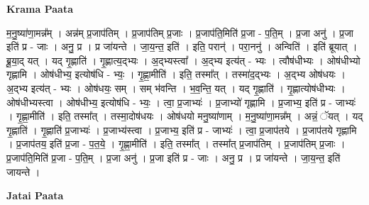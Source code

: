 \documentclass[17pt]{extarticle}
\begin{document}
\textbf{Krama Paata} \newline

म॒नु॒ष्या॑णा॒मन्न᳚म् । अन्न॑म् प्र॒जाप॑तिम् । प्र॒जाप॑तिम् प्र॒जाः । प्र॒जाप॑ति॒मिति॑ प्र॒जा - प॒ति॒म् । प्र॒जा अनु॑ । प्र॒जा इति॑ प्र - जाः । अनु॒ प्र । प्र जा॑यन्ते । जा॒य॒न्त॒ इति॑ । इति॒ परान्॑ । परा॒ननु॑ । अन्विति॑ । इति॑ ब्रूयात् । ब्रू॒या॒द् यत् । यद् गृ॒ह्णाति॑ । गृ॒ह्णात्य॒द्भ्यः । अ॒द्भ्यस्त्वा᳚ । अ॒द्भ्य इत्य॑त् - भ्यः । त्वौष॑धीभ्यः । ओष॑धीभ्यो गृह्णामि । ओष॑धीभ्य॒ इत्योष॑धि - भ्यः॒ । गृ॒ह्णा॒मीति॑ । इति॒ तस्मा᳚त् । तस्मा॑द॒द्भ्यः । अ॒द्भ्य ओष॑धयः । अ॒द्भ्य इत्य॑त् - भ्यः । ओष॑धयः॒ सम् । सम् भ॑वन्ति । भ॒व॒न्ति॒ यत् । यद् गृ॒ह्णाति॑ । गृ॒ह्णात्योष॑धीभ्यः । ओष॑धीभ्यस्त्वा । ओष॑धीभ्य॒ इत्योष॑धि - भ्यः॒ । त्वा॒ प्र॒जाभ्यः॑ । प्र॒जाभ्यो॑ गृह्णामि । प्र॒जाभ्य॒ इति॑ प्र - जाभ्यः॑ । गृ॒ह्णा॒मीति॑ । इति॒ तस्मा᳚त् । तस्मा॒दोष॑धयः । ओष॑धयो मनु॒ष्या॑णाम् । म॒नु॒ष्या॑णा॒मन्न᳚म् । अन्नं॒ ॅयत् । यद् गृ॒ह्णाति॑ । गृ॒ह्णाति॑ प्र॒जाभ्यः॑ । प्र॒जाभ्य॑स्त्वा । प्र॒जाभ्य॒ इति॑ प्र - जाभ्यः॑ । त्वा॒ प्र॒जाप॑तये । प्र॒जाप॑तये गृह्णामि । प्र॒जाप॑तय॒ इति॑ प्र॒जा - प॒त॒ये॒ । गृ॒ह्णा॒मीति॑ । इति॒ तस्मा᳚त् । तस्मा᳚त् प्र॒जाप॑तिम् । प्र॒जाप॑तिम् प्र॒जाः । प्र॒जाप॑ति॒मिति॑ प्र॒जा - प॒ति॒म् । प्र॒जा अनु॑ । प्र॒जा इति॑ प्र - जाः । अनु॒ प्र । प्र जा॑यन्ते । जा॒य॒न्त॒ इति॑ जायन्ते । \newline

\textbf{Jatai Paata} \newline
\end{document}
